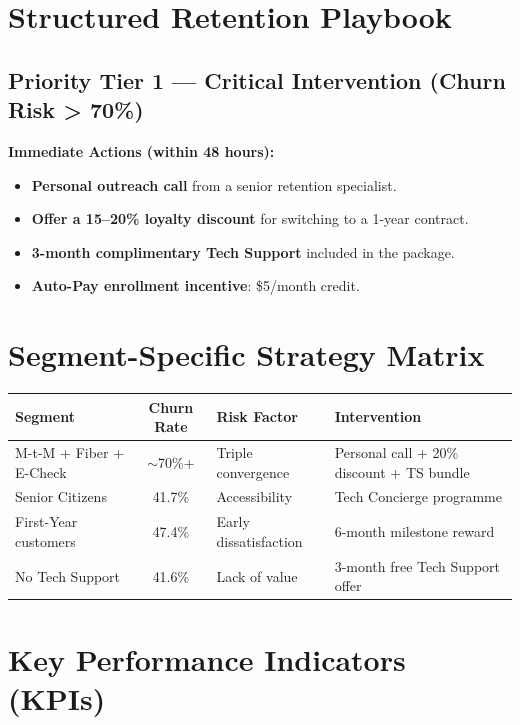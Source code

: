 \documentclass[11pt,a4paper]{article}
\begin{document}
\section{Structured Retention Playbook}

\subsection{Priority Tier 1 — Critical Intervention (Churn Risk > 70\%)}
\textbf{Immediate Actions (within 48 hours):}
\begin{itemize}[label=$\square$]
    \item \textbf{Personal outreach call} from a senior retention specialist.
    \item \textbf{Offer a 15–20\% loyalty discount} for switching to a 1-year contract.
    \item \textbf{3-month complimentary Tech Support} included in the package.
    \item \textbf{Auto-Pay enrollment incentive}: \$5/month credit.
\end{itemize}

\newpage

\section{Segment-Specific Strategy Matrix}

\begin{longtable}{l c p{3cm} p{4cm}}
\toprule
\textbf{Segment} & \textbf{Churn Rate} & \textbf{Risk Factor} & \textbf{Intervention} \\
\midrule
M-t-M + Fiber + E-Check & $\sim$70\%+ & Triple convergence & Personal call + 20\% discount + TS bundle \\
Senior Citizens & 41.7\% & Accessibility & Tech Concierge programme \\
First-Year customers & 47.4\% & Early dissatisfaction & 6-month milestone reward \\
No Tech Support & 41.6\% & Lack of value & 3-month free Tech Support offer \\
\bottomrule
\end{longtable}

\section{Key Performance Indicators (KPIs)}
\end{document}

